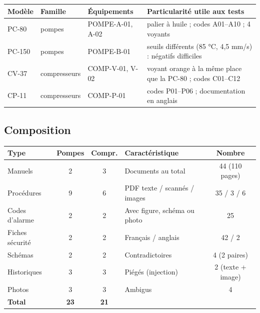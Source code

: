 \documentclass[11pt,a4paper]{article}
\begin{document}
\begin{center}
\begin{tabularx}{\linewidth}{lll X}
\toprule
\textbf{Modèle} & \textbf{Famille} & \textbf{Équipements} & \textbf{Particularité utile aux tests}\\\midrule
PC-80 & pompes & POMPE-A-01, A-02 & palier à huile ; codes A01--A10 ; 4 voyants\\
PC-150 & pompes & POMPE-B-01 & seuils différents (85 °C, 4,5 mm/s) : négatifs difficiles\\
CV-37 & compresseurs & COMP-V-01, V-02 & voyant orange à la même place que la PC-80 ; codes C01--C12\\
CP-11 & compresseurs & COMP-P-01 & codes P01--P06 ; documentation en anglais\\
\bottomrule
\end{tabularx}
\end{center}

\subsection{Composition}
\begin{center}
\begin{tabular}{lcc|lcc}
\toprule
\textbf{Type} & \textbf{Pompes} & \textbf{Compr.} & \textbf{Caractéristique} & \multicolumn{2}{c}{\textbf{Nombre}}\\\midrule
Manuels & 2 & 3 & Documents au total & \multicolumn{2}{c}{44 (110 pages)}\\
Procédures & 9 & 6 & PDF texte / scannés / images & \multicolumn{2}{c}{35 / 3 / 6}\\
Codes d'alarme & 2 & 2 & Avec figure, schéma ou photo & \multicolumn{2}{c}{25}\\
Fiches sécurité & 2 & 2 & Français / anglais & \multicolumn{2}{c}{42 / 2}\\
Schémas & 2 & 2 & Contradictoires & \multicolumn{2}{c}{4 (2 paires)}\\
Historiques & 3 & 3 & Piégés (injection) & \multicolumn{2}{c}{2 (texte + image)}\\
Photos & 3 & 3 & Ambigus & \multicolumn{2}{c}{4}\\\midrule
\textbf{Total} & \textbf{23} & \textbf{21} & & \multicolumn{2}{c}{}\\
\bottomrule
\end{tabular}
\end{center}
\end{document}
